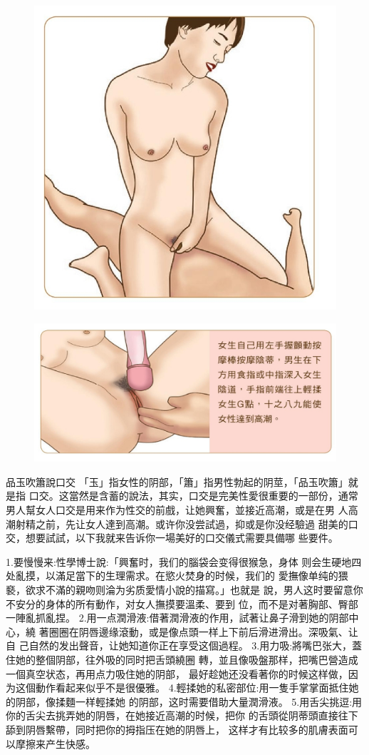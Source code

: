 \documentclass[12pt,UTF8]{ctexbook}
\begin{document}
\begin{figure}[htbp]
	\centering
	\includegraphics[width=0.7\linewidth]{17}
	\caption{}
	\label{fig:1}
\end{figure}

\begin{figure}[htbp]
	\centering
	\includegraphics[width=0.7\linewidth]{18}
	\caption{}
	\label{fig:1}
\end{figure}

品玉吹簫說口交
「玉」指女性的阴部，「簫」指男性勃起的阴莖，「品玉吹簫」就是指
口交。这當然是含蓄的說法，其实，口交是完美性愛很重要的一部份，通常
男人幫女人口交是用来作为性交的前戲，让她興奮，並接近高潮，或是在男
人高潮射精之前，先让女人達到高潮。或许你没尝試過，抑或是你没经驗過
甜美的口交，想要試試，以下我就来告诉你一場美好的口交儀式需要具備哪
些要件。

1.要慢慢来:性學博士說:「興奮时，我们的腦袋会变得很猴急，身体
则会生硬地四处亂摸，以滿足當下的生理需求。在慾火焚身的时候，我们的
愛撫像单纯的猥褻，欲求不滿的親吻则淪为劣质愛情小說的描寫。」也就是
說，男人这时要留意你不安分的身体的所有動作，对女人撫摸要溫柔、要到
位，而不是对著胸部、臀部一陣亂抓亂捏。
2.用一点潤滑液:借著潤滑液的作用，試著让鼻子滑到她的阴部中心，繞
著圈圈在阴唇邊缘滾動，或是像点頭一样上下前后滑进滑出。深吸氣、让自
己自然的发出聲音，让她知道你正在享受这個過程。
3.用力吸:將嘴巴张大，蓋住她的整個阴部，往外吸的同时把舌頭繞圈
轉，並且像吸盤那样，把嘴巴營造成一個真空状态，再用点力吸住她的阴部，
最好趁她还没看著你的时候这样做，因为这個動作看起来似乎不是很優雅。
4.輕揉她的私密部位:用一隻手掌掌面抵住她的阴部，像揉麵一样輕揉她
的阴部，这时需要借助大量潤滑液。
5.用舌尖挑逗:用你的舌尖去挑弄她的阴唇，在她接近高潮的时候，把你
的舌頭從阴蒂頭直接往下舔到阴唇繫帶，同时把你的拇指压在她的阴唇上，
这样才有比较多的肌膚表面可以摩擦来产生快感。
\end{document}
